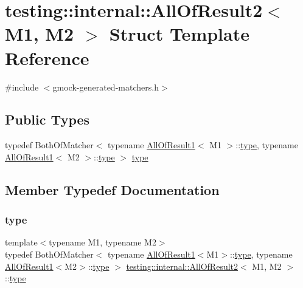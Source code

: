 \hypertarget{structtesting_1_1internal_1_1_all_of_result2}{}\section{testing\+::internal\+::All\+Of\+Result2$<$ M1, M2 $>$ Struct Template Reference}
\label{structtesting_1_1internal_1_1_all_of_result2}


{\ttfamily \#include $<$gmock-\/generated-\/matchers.\+h$>$}

\subsection*{Public Types}
\begin{DoxyCompactItemize}
\item 
typedef Both\+Of\+Matcher$<$ typename \mbox{\hyperlink{structtesting_1_1internal_1_1_all_of_result1}{All\+Of\+Result1}}$<$ M1 $>$\+::\mbox{\hyperlink{structtesting_1_1internal_1_1_all_of_result2_adec0b0ce2fdd07d398e1fdd2cdb88392}{type}}, typename \mbox{\hyperlink{structtesting_1_1internal_1_1_all_of_result1}{All\+Of\+Result1}}$<$ M2 $>$\+::\mbox{\hyperlink{structtesting_1_1internal_1_1_all_of_result2_adec0b0ce2fdd07d398e1fdd2cdb88392}{type}} $>$ \mbox{\hyperlink{structtesting_1_1internal_1_1_all_of_result2_adec0b0ce2fdd07d398e1fdd2cdb88392}{type}}
\end{DoxyCompactItemize}


\subsection{Member Typedef Documentation}
\mbox{\label{structtesting_1_1internal_1_1_all_of_result2_adec0b0ce2fdd07d398e1fdd2cdb88392}} 
\subsubsection{\texorpdfstring{type}{type}}
{\footnotesize\ttfamily template$<$typename M1, typename M2$>$ \\
typedef Both\+Of\+Matcher$<$ typename \mbox{\hyperlink{structtesting_1_1internal_1_1_all_of_result1}{All\+Of\+Result1}}$<$M1$>$\+::\mbox{\hyperlink{structtesting_1_1internal_1_1_all_of_result2_adec0b0ce2fdd07d398e1fdd2cdb88392}{type}}, typename \mbox{\hyperlink{structtesting_1_1internal_1_1_all_of_result1}{All\+Of\+Result1}}$<$M2$>$\+::\mbox{\hyperlink{structtesting_1_1internal_1_1_all_of_result2_adec0b0ce2fdd07d398e1fdd2cdb88392}{type}} $>$ \mbox{\hyperlink{structtesting_1_1internal_1_1_all_of_result2}{testing\+::internal\+::\+All\+Of\+Result2}}$<$ M1, M2 $>$\+::\mbox{\hyperlink{structtesting_1_1internal_1_1_all_of_result2_adec0b0ce2fdd07d398e1fdd2cdb88392}{type}}}




